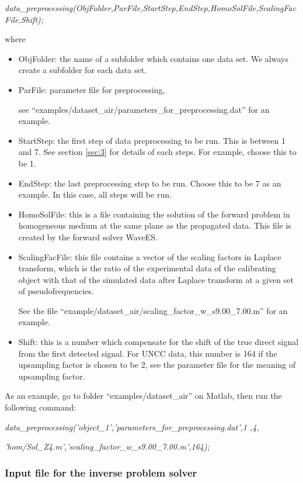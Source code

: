 \documentclass[a4paper,12pt]{article}
\begin{document}
\textit{data\_preprocessing(ObjFolder,ParFile,StartStep,EndStep,HomoSolFile,ScalingFacFile,Shift);}

where 
\begin{itemize}
   \item ObjFolder:  the name of a subfolder which contains one data set. We always create a subfolder for each data set. 
\item ParFile: parameter file for preprocessing, 

see ``examples/dataset\_air/parameters\_for\_preprocessing.dat'' for an example.
\item StartStep: the first step of data preprocessing to be run. This is between 1 and 7. See section \ref{sec:3} for details of each steps. For example, choose this to be 1. 

\item EndStep: the last preprocessing step to be run. Choose this to be 7 as an example. In this case, all steps will be run. 

\item HomoSolFile: this is a file containing the solution of the forward problem in homogeneous medium at the same plane as the propagated data. This file is created by the forward solver WaveES.  

\item ScalingFacFile: this file contains a vector of the scaling factors in Laplace transform, which is the ratio of the experimental data of the calibrating object with that of the simulated data after Laplace transform at a given set of pseudofrequencies. 

See the file ``example/dataset\_air/scaling\_factor\_w\_s9.00\_7.00.m'' for an example.
\item Shift: this is a number which compensate for the shift of the true direct signal from the first detected signal. For UNCC data, this number is 164 if the upsampling factor is chosen to be 2, see the parameter file for the meaning of upsampling factor. 


\end{itemize}

As an example, go to folder ``examples/dataset\_air'' on Matlab, then run the following command: 


\textit{data\_preprocessing('object\_1','parameters\_for\_preprocessing.dat',1 ,4,}

\textit{'hom/Sol\_Z4.m','scaling\_factor\_w\_s9.00\_7.00.m',164);}
 
\subsubsection{Input file for the inverse problem solver}
\end{document}
